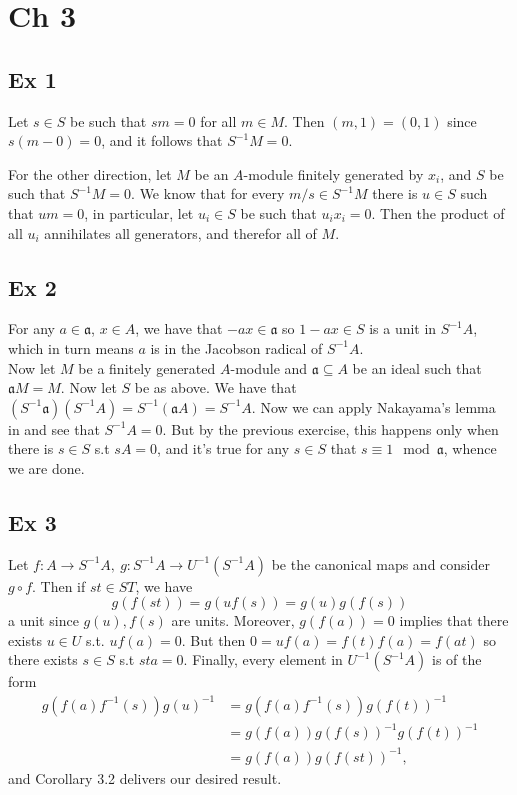 \documentclass{article}
\theoremstyle{definition}
\begin{document}
\section*{Ch 3}

\subsection*{Ex 1}
Let $s \in S$ be such that $sm = 0$ for all $m \in M$. Then $(m, 1) = (0, 1)$
since $s(m - 0) = 0$, and it follows that $S^{-1}M = 0$.

For the other direction, let $M$ be an $A$-module finitely generated by $x_i$,
and $S$ be such that $S^{-1}M = 0$. We know that for every $m/s \in S^{-1}M$
there is $u \in S$ such that $um = 0$, in particular, let $u_i \in S$ be such
that $u_ix_i = 0$. Then the product of all $u_i$ annihilates all generators,
and therefor all of $M$.

\subsection*{Ex 2}

For any $a \in \mathfrak{a}$, $x \in A$, we have that $-ax \in \mathfrak{a}$
so $1 - ax \in S$ is a unit in $S^{-1}A$, which in turn means $a$ is 
in the Jacobson radical of $S^{-1}A$. \\

Now let $M$ be a finitely generated $A$-module and $\mathfrak{a} \subseteq A$
be an ideal such that $\mathfrak{a}M = M$. Now let $S$ be as above. We have
that $(S^{-1}\mathfrak{a})(S^{-1}A) = S^{-1}(\mathfrak{a}A) = S^{-1}A$. Now we
can apply Nakayama's lemma in and see that $S^{-1}A = 0$. But by the previous
exercise, this happens only when there is $s \in S$ s.t $sA = 0$, and it's true
for any $s \in S$ that $s \equiv 1 \mod \mathfrak{a}$, whence we are done.

\subsection*{Ex 3}

Let $f : A \to S^{-1}A,\ g : S^{-1}A \to U^{-1}(S^{-1}A)$ be the canonical maps
and consider $g \circ f$. Then if $st \in ST$, we have
\[
	g(f(st)) 
	= 
	g(uf(s))
	= 
	g(u)g(f(s))
\]
a unit since $g(u), f(s)$ are units. Moreover, $g(f(a)) = 0$ implies that there exists
$u \in U$ s.t. $uf(a) = 0$. But then $0 = uf(a) = f(t)f(a) = f(at)$ so there exists 
$s \in S$ s.t $sta = 0$. Finally, every element in $U^{-1}(S^{-1}A)$ is of the form
\begin{align*}
g(f(a)f^{-1}(s))g(u)^{-1}
&=
g(f(a)f^{-1}(s))g(f(t))^{-1} \\
&=
g(f(a))g(f(s))^{-1}g(f(t))^{-1} \\
&=
g(f(a))g(f(st))^{-1},
\end{align*} 
and Corollary 3.2 delivers our desired result.
\end{document}
